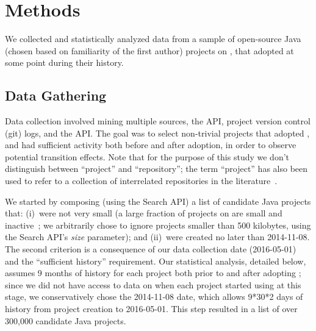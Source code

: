 
\section{Methods}
\label{sec:method}

We collected and statistically analyzed data from a sample of open-source 
Java (chosen based on familiarity of the first author) projects on \GH, that 
adopted \Tvis at some point during their history.

\subsection{Data Gathering}

Data collection involved mining multiple sources, the \GH API, project version 
control (git) logs, and the \Tvis API.
The goal was to select non-trivial projects that adopted \Tvis, and had sufficient
activity both before and after adoption, in order to observe potential transition effects.
Note that for the purpose of this study we don't distinguish between ``project'' 
and ``repository''; the term ``project'' has also been used to refer to a collection 
of interrelated repositories in the literature~\cite{vasilescu2016sky}.

We started by composing (using the \GH Search API) a list of candidate Java 
projects that: (i)~were not very small (a large fraction of projects on \GH are 
small and inactive~\cite{gousios2014exploratory}; we arbitrarily chose to ignore
projects smaller than 500 kilobytes, using the \GH Search API's \emph{size} 
parameter); and (ii)~were created no later than 2014-11-08. 
The second criterion is a consequence of our data collection date (2016-05-01)
and the ``sufficient history'' requirement. 
Our statistical analysis, detailed below, assumes 9 months of history for each
project both prior to and after adopting \Tvis; since we did not have access to
data on when each project started using \Tvis at this stage, we conservatively
chose the 2014-11-08 date, which allows 9*30*2 days of history from project 
creation to 2016-05-01.
This step resulted in a list of over 300,000 candidate Java projects.

